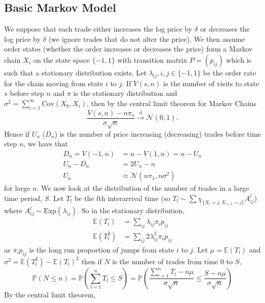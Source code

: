 \documentclass[a4paper,10pt]{article}
\begin{document}
\subsection{Basic Markov Model}
We suppose that each trade either increases the log price by $\delta$ or decreases the log price by $\delta$ (we ignore trades that do not alter the price). We then assume order states (whether the order increases or decreases the price) form a Markov chain $X_i$ on the state space $\{-1, 1\}$ with transition matrix $P = (p_{ij})$ which is such that a stationary distribution exists. Let $\lambda_{ij}, i,j \in \{-1, 1\}$ be the order rate for the chain moving from state $i$ to $j$. If $V(s, n)$ is the number of visits to state $s$ before step $n$ and $\pi$ is the stationary distribution and $\sigma^2 = \sum_{i=1}^{\infty}\text{Cov}(X_0, X_i)$, then by the central limit theorem for Markov Chains \cite{markovclt}
\begin{equation}
\frac{V(s, n) - n\pi_s}{\sigma \sqrt{n}} \xrightarrow{\text{d}} \mathcal{N}(0, 1).
\end{equation}
Hence if $U_n$ ($D_n$) is the number of price increasing (decreasing) trades before time step $n$, we have that
\begin{align}
D_n = V(-1, n) &= n - V(1, n) = n - U_n \\
U_n - D_n &= 2U_n - n \\
U_n &\approx  \mathcal{N}(n\pi_1, n\sigma^2)
\end{align}
for large $n$. 
We now look at the distribution of the number of trades in a large time period, $S$. Let $T_l$ be the $l$th interarrival time (so $T_l \sim \sum \chi_{\{X_l = j, X_{l + 1} = j\}} A_{ij}^l $) where $A_{ij}^l \sim \text{Exp}(\lambda_{ij})$. So in the stationary distribution,
\begin{align}
\mathbb{E}(T_l) &= \sum_{ij} \lambda_{ij}\pi_{i}p_{ij}\\
\mathbb{E}(T_l^2) &=  \sum_{ij} 2\lambda_{ij}^2\pi_{i}p_{ij}
\end{align}
as $\pi_i p_{ij}$ is the long run proportion of jumps from state $i$ to $j$. Let $\mu = \mathbb{E}(T_l)$ and $\sigma^2 = \mathbb{E}(T_l^2) - \mathbb{E}(T_l)^2$ then if $N$ is the number of trades from time $0$ to $S$,
\begin{equation}
\mathbb{P}(N \leq n) = \mathbb{P}\left(\sum_{l=1}^n T_l \leq S\right) = \mathbb{P}\left(\frac{\sum_{l=1}^n T_l - n\mu}{\sigma \sqrt{n}} \leq \frac{S - n\mu}{\sigma \sqrt{n}} \right) 
\end{equation}
By the central limit theorem, 
\end{document}
